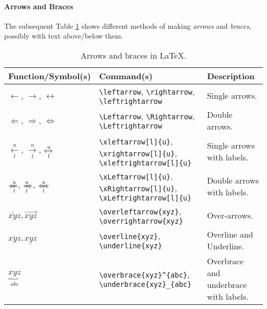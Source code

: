 \paragraph{Arrows and Braces} The subsequent Table \ref{tab:arrowbrace} shows different methods of making \textit{arrows} and \textit{braces}, possibly with text above/below them.

\begin{table}[ht!]
\begin{tabularx}{\textwidth}{|p{}|>{\raggedright}p{}|X|}
\hline
Function/Symbol(s) & Command(s) & Description \\
\hline
$\leftarrow$, $\rightarrow$, $\leftrightarrow$ & \texttt{\textbackslash leftarrow}, \texttt{\textbackslash rightarrow}, \texttt{\textbackslash leftrightarrow} & Single arrows. \\
\hline
$\Leftarrow$, $\Rightarrow$, $\Leftrightarrow$ & \texttt{\textbackslash Leftarrow}, \texttt{\textbackslash Rightarrow}, \texttt{\textbackslash Leftrightarrow} & Double arrows. \\
\hline
$\xleftarrow[l]{u}$, $\xrightarrow[l]{u}$, $\xleftrightarrow[l]{u}$ & \texttt{\textbackslash xleftarrow[l]\{u\}}, \texttt{\textbackslash xrightarrow[l]\{u\}}, \texttt{\textbackslash xleftrightarrow[l]\{u\}} & Single arrows with labels. \\
\hline
$\xLeftarrow[l]{u}$, $\xRightarrow[l]{u}$, $\xLeftrightarrow[l]{u}$ & \texttt{\textbackslash xLeftarrow[l]\{u\}}, \texttt{\textbackslash xRightarrow[l]\{u\}}, \texttt{\textbackslash xLeftrightarrow[l]\{u\}} & Double arrows with labels. \\
\hline
$\overleftarrow{xyz}, \overrightarrow{xyz}$ & \texttt{\textbackslash overleftarrow\{xyz\}}, \texttt{\textbackslash overrightarrow\{xyz\}} & Over-arrows. \\
\hline
$\overline{xyz}, \underline{xyz}$ & \texttt{\textbackslash overline\{xyz\}}, \texttt{\textbackslash underline\{xyz\}} & Overline and Underline. \\
\hline
\raisebox{-10pt}{\smash{$\overbrace{xyz}^{abc}$},} $\underbrace{xyz}_{abc}$ & \texttt{\textbackslash overbrace\{xyz\}\^{}\{abc\}}, \texttt{\textbackslash underbrace\{xyz\}\_\{abc\}} & Overbrace and underbrace with labels. \\
\hline
\end{tabularx}
\caption{Arrows and braces in \LaTeX{}.}
\label{tab:arrowbrace}
\end{table}

